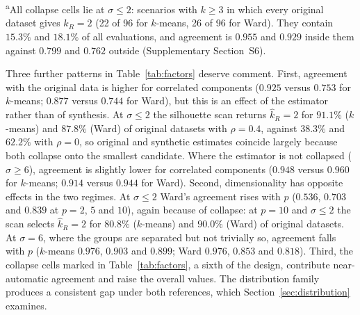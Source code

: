 \documentclass[pdflatex,referee]{sn-jnl}
\begin{document}
\begin{table}[t]
\centering
\caption{Agreement in the number of groups by design factor, over the full
         720{,}000-evaluation design, under the two references of
         Eq.~\eqref{eq:sr}: the planted number of groups ($\mathrm{RR}$) and
         the number estimated from the original data ($\mathrm{AG}$). Each
         entry is a marginal mean over all other factors; candidate range
         $\{2,\dots,8\}$. Wilcoxon $p$: paired signed-rank test of $k$-means
         against Ward across the 144 scenario-level means. The capped range
         $\{2,\dots,\min(k+3,8)\}$ is reported in Supplementary Table~S2.}
\label{tab:factors}
\small

\par\smallskip
\begin{minipage}{0.92\linewidth}\footnotesize
\textsuperscript{a}All collapse cells lie at $\sigma \le 2$: scenarios with
$k \ge 3$ in which every original dataset gives $\hat{k}_R = 2$ (22 of 96 for
$k$-means, 26 of 96 for Ward). They contain $15.3\%$ and $18.1\%$ of all
evaluations, and agreement is $0.955$ and $0.929$ inside them against $0.799$
and $0.762$ outside (Supplementary Section~S6).
\end{minipage}
\end{table}

Three further patterns in Table~\ref{tab:factors} deserve comment. First,
agreement with the original data is higher for correlated components
($0.925$ versus $0.753$ for $k$-means; $0.877$ versus $0.744$ for Ward), but
this is an effect of the estimator rather than of synthesis. At
$\sigma \le 2$ the silhouette scan returns $\hat{k}_R = 2$ for $91.1\%$
($k$-means) and $87.8\%$ (Ward) of original datasets with $\rho = 0.4$,
against $38.3\%$ and $62.2\%$ with $\rho = 0$, so original and synthetic
estimates coincide largely because both collapse onto the smallest candidate.
Where the estimator is not collapsed ($\sigma \ge 6$), agreement is slightly
lower for correlated components ($0.948$ versus $0.960$ for $k$-means;
$0.914$ versus $0.944$ for Ward). Second, dimensionality has opposite effects
in the two regimes. At $\sigma \le 2$ Ward's agreement rises with $p$ ($0.536$,
$0.703$ and $0.839$ at $p = 2$, $5$ and $10$), again because of collapse: at
$p = 10$ and $\sigma \le 2$ the scan selects $\hat{k}_R = 2$ for $80.8\%$
($k$-means) and $90.0\%$ (Ward) of original datasets. At $\sigma = 6$, where
the groups are separated but not trivially so, agreement falls with $p$
($k$-means $0.976$, $0.903$ and $0.899$; Ward $0.976$, $0.853$ and $0.818$).
Third, the collapse cells marked in Table~\ref{tab:factors}, a sixth of the
design, contribute near-automatic agreement and raise the overall values. The
distribution family produces a consistent gap under both references, which
Section~\ref{sec:distribution} examines.
\end{document}

